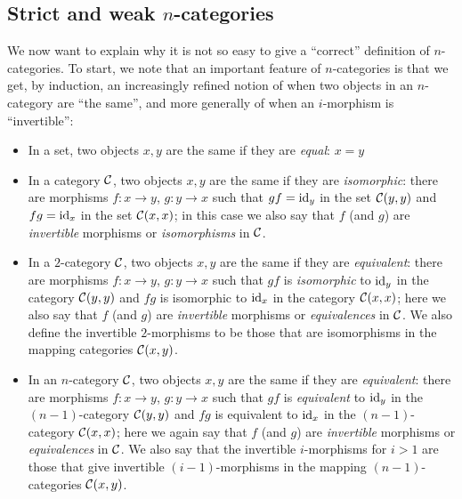 \documentclass[a4paper,11pt]{article}
\begin{document}
\subsection{Strict and weak $n$-categories}\label{subsec:weak}
We now want to explain why it is not so easy to give a ``correct''
definition of $n$-categories. To start, we note that an important
feature of $n$-categories is that we get, by induction, an
increasingly refined
notion of when two objects in an $n$-category are ``the same'', and
more generally of when an $i$-morphism is ``invertible'':
\begin{itemize}
\item In a set, two objects $x,y$ are the same if they are
  \emph{equal}: $x = y$
\item In a category $\mathcal{C}$, two objects $x, y$ are the same if they are
  \emph{isomorphic}: there are morphisms $f \colon x \to y$, $g \colon
  y \to x$ such that $gf = \text{\textup{id}}_{y}$ in the set $\mathcal{C}(y,y)$ and $fg =
  \text{\textup{id}}_{x}$ in the set $\mathcal{C}(x,x)$; in this case we also say that $f$ (and $g$)
  are \emph{invertible} morphisms or \emph{isomorphisms} in $\mathcal{C}$.
\item In a $2$-category $\mathcal{C}$, two objects $x, y$ are the same if they are
  \emph{equivalent}: there are morphisms $f \colon x \to y$, $g \colon
  y \to x$ such that $gf$ is \emph{isomorphic} to $\text{\textup{id}}_{y}$ in the
  category $\mathcal{C}(y,y)$ and $fg$ is isomorphic to $\text{\textup{id}}_{x}$ in the
  category $\mathcal{C}(x,x)$; here we also say that $f$ (and $g$)
  are \emph{invertible} morphisms or \emph{equivalences} in $\mathcal{C}$. We
  also define the invertible $2$-morphisms to be those that are
  isomorphisms in the mapping categories $\mathcal{C}(x,y)$.
\item In an $n$-category $\mathcal{C}$, two objects $x, y$ are the same if they are
  \emph{equivalent}: there are morphisms $f \colon x \to y$, $g \colon
  y \to x$ such that $gf$ is \emph{equivalent} to $\text{\textup{id}}_{y}$ in the
  $(n-1)$-category $\mathcal{C}(y,y)$ and $fg$ is equivalent to $\text{\textup{id}}_{x}$ in the
  $(n-1)$-category $\mathcal{C}(x,x)$; here we again say that $f$ (and $g$)
  are \emph{invertible} morphisms or \emph{equivalences} in $\mathcal{C}$. We
  also say that the invertible $i$-morphisms for $i > 1$ are those
  that give invertible $(i-1)$-morphisms in the mapping
  $(n-1)$-categories $\mathcal{C}(x,y)$.
\end{itemize}
\end{document}
